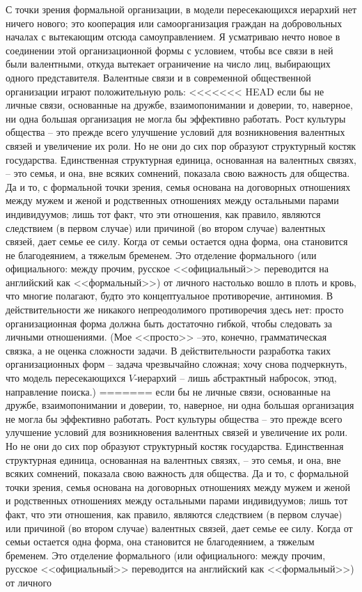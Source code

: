 \documentclass{book}
\begin{document}
С точки зрения формальной организации, в модели пересека­ющихся иерархий нет ничего нового; это кооперация или самоор­ганизация граждан на добровольных началах с вытекающим от­сюда самоуправлением. Я усматриваю нечто новое в соединении этой организационной формы с условием, чтобы все связи в ней были валентными, откуда вытекает ограничение на число лиц, выбирающих одного представителя. Валентные связи и в совре­менной общественной организации играют положительную роль:
<<<<<<< HEAD
если бы не личные связи, основанные на дружбе, взаимопонима­нии и доверии, то, наверное, ни одна большая организация не мог­ла бы эффективно работать. Рост культуры общества -- это преж­де всего улучшение условий для возникновения валентных свя­зей и увеличение их роли. Но не они до сих пор образуют струк­турный костяк государства. Единственная структурная единица, основанная на валентных связях, -- это семья, и она, вне всяких сомнений, показала свою важность для общества. Да и то, с фор­мальной точки зрения, семья основана на договорных отношениях между мужем и женой и родственных отношениях между осталь­ными парами индивидуумов; лишь тот факт, что эти отношения, как правило, являются следствием (в первом случае) или причи­ной (во втором случае) валентных связей, дает семье ее силу. Когда от семьи остается одна форма, она становится не благодея­нием, а тяжелым бременем. Это отделение формального  (или официального:  между прочим, русское <<официальный>> перево­дится на английский как <<формальный>>) от личного  настолько вошло в плоть и кровь, что многие полагают, будто это концеп­туальное противоречие, антиномия. В действительности же ника­кого непреодолимого противоречия здесь нет: просто организа­ционная форма должна быть достаточно гибкой, чтобы следо­вать за личными отношениями. (Мое <<просто>> --это, конечно, грамматическая связка, а не оценка сложности задачи. В дейст­вительности разработка таких организационных форм -- задача чрезвычайно сложная; хочу снова подчеркнуть, что модель пересекающихся $V$‑иерархий -- лишь абстрактный набросок, этюд, направление поиска.)
=======
если бы не личные связи, основанные на дружбе, взаимопонима­нии и доверии, то, наверное, ни одна большая организация не мог­ла бы эффективно работать. Рост культуры общества -- это преж­де всего улучшение условий для возникновения валентных свя­зей и увеличение их роли. Но не они до сих пор образуют струк­турный костяк государства. Единственная структурная единица, основанная на валентных связях, -- это семья, и она, вне всяких сомнений, показала свою важность для общества. Да и то, с фор­мальной точки зрения, семья основана на договорных отношениях между мужем и женой и родственных отношениях между осталь­ными парами индивидуумов; лишь тот факт, что эти отношения, как правило, являются следствием (в первом случае) или причи­ной (во втором случае) валентных связей, дает семье ее силу. Когда от семьи остается одна форма, она становится не благодея­нием, а тяжелым бременем. Это отделение формального  (или официального:  между прочим, русское <<официальный>> перево­дится на английский как <<формальный>>) от личного 
\end{document}
